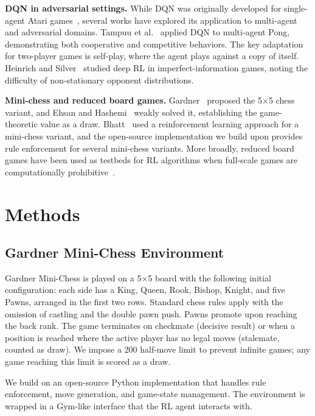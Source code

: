 \documentclass[letterpaper]{article}
\begin{document}
\textbf{DQN in adversarial settings.}
While DQN was originally developed for single-agent Atari games~\cite{mnih2015human}, several works have explored its application to multi-agent and adversarial domains.
Tampuu et al.~\cite{tampuu2017} applied DQN to multi-agent Pong, demonstrating both cooperative and competitive behaviors.
The key adaptation for two-player games is self-play, where the agent plays against a copy of itself.
Heinrich and Silver~\cite{heinrich2016} studied deep RL in imperfect-information games, noting the difficulty of non-stationary opponent distributions.

\textbf{Mini-chess and reduced board games.}
Gardner~\cite{gardner1970} proposed the 5$\times$5 chess variant, and Ehsan and Hashemi~\cite{ehsan2012} weakly solved it, establishing the game-theoretic value as a draw.
Bhatt~\cite{bhatt2018} used a reinforcement learning approach for a mini-chess variant, and the open-source implementation we build upon provides rule enforcement for several mini-chess variants.
More broadly, reduced board games have been used as testbeds for RL algorithms when full-scale games are computationally prohibitive~\cite{lanctot2019openspiel}.


\section{Methods}

\subsection{Gardner Mini-Chess Environment}

Gardner Mini-Chess is played on a 5$\times$5 board with the following initial configuration: each side has a King, Queen, Rook, Bishop, Knight, and five Pawns, arranged in the first two rows.
Standard chess rules apply with the omission of castling and the double pawn push.
Pawns promote upon reaching the back rank.
The game terminates on checkmate (decisive result) or when a position is reached where the active player has no legal moves (stalemate, counted as draw).
We impose a 200 half-move limit to prevent infinite games; any game reaching this limit is scored as a draw.

We build on an open-source Python implementation that handles rule enforcement, move generation, and game-state management.
The environment is wrapped in a Gym-like interface that the RL agent interacts with.
\end{document}
